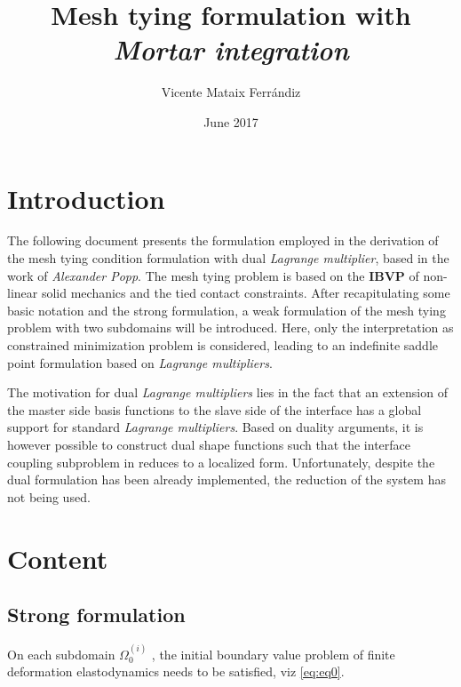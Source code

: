 \documentclass[a4paper,10pt]{article} %
\title{Mesh tying formulation with \em{Mortar} integration}
\author{Vicente Mataix Ferr\'andiz}
\date{June 2017}
\begin{document}

\maketitle

\section{Introduction}

The following document presents the formulation employed in the derivation of the mesh tying condition formulation with dual \textit{Lagrange multiplier}, based in the work of \textit{Alexander Popp}\cite{popp1,popp2}. The mesh tying problem is based on the \textbf{IBVP} of non-linear solid mechanics  and the tied contact constraints. After recapitulating some basic notation and the strong formulation, a weak formulation of the mesh tying problem with two subdomains will be introduced. Here, only the interpretation as constrained minimization problem is considered, leading to an indefinite saddle point formulation based on \textit{Lagrange multipliers}.

The motivation for dual \textit{Lagrange multipliers}\cite{wohlmuth} lies in the fact that an extension of the master side basis functions to the slave side of the interface has a global support for standard \textit{Lagrange multipliers}. Based on duality arguments, it is however possible to construct dual shape functions such that the interface coupling subproblem in reduces to a localized form. Unfortunately, despite the dual formulation has been already implemented, the reduction of the system has not being used.

\section{Content}

\subsection{Strong formulation}

On each subdomain $\Omega_0^{(i)}$ , the initial boundary value problem of finite deformation elastodynamics needs to be satisfied, viz \eqref{eq:eq0}.
\end{document}
